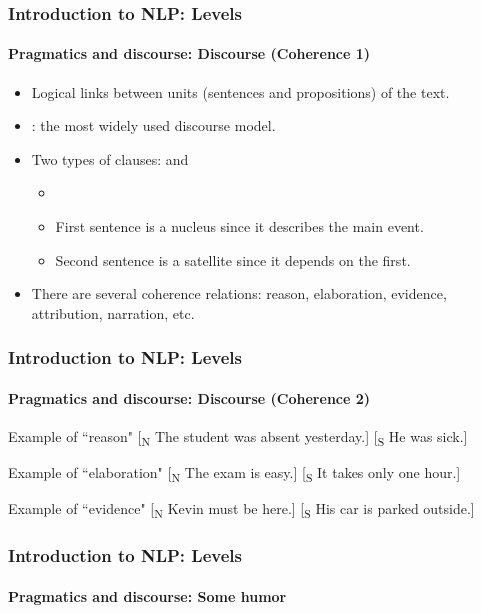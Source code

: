 \documentclass[xcolor=table]{beamer}
\begin{document}
\begin{frame}
\frametitle{Introduction to NLP: Levels}
\framesubtitle{Pragmatics and discourse: Discourse (Coherence 1)}

\begin{itemize}
	\item Logical links between units (sentences and propositions) of the text.
	\item {}: the most widely used discourse model.
	\item Two types of clauses:  and 
	\begin{itemize}
		\item {}
		\item First sentence is a nucleus since it describes the main event.
		\item Second sentence is a satellite since it depends on the first.
	\end{itemize}
	\item There are several coherence relations: reason, elaboration, evidence, attribution, narration, etc.
\end{itemize}

\end{frame}

\begin{frame}
\frametitle{Introduction to NLP: Levels}
\framesubtitle{Pragmatics and discourse: Discourse (Coherence 2)}

\begin{exampleblock}{Example of ``reason"}
	[\textsubscript{N} The student was absent yesterday.] [\textsubscript{S} He was sick.]
\end{exampleblock}

\begin{exampleblock}{Example of ``elaboration"}
	[\textsubscript{N} The exam is easy.] [\textsubscript{S} It takes only one hour.]
\end{exampleblock}

\begin{exampleblock}{Example of ``evidence"}
	[\textsubscript{N} Kevin must be here.] [\textsubscript{S} His car is parked outside.]
\end{exampleblock}

\end{frame}

\begin{frame}
\frametitle{Introduction to NLP: Levels}
\framesubtitle{Pragmatics and discourse: Some humor}

\begin{center}
\end{center}

\end{frame}
\end{document}
